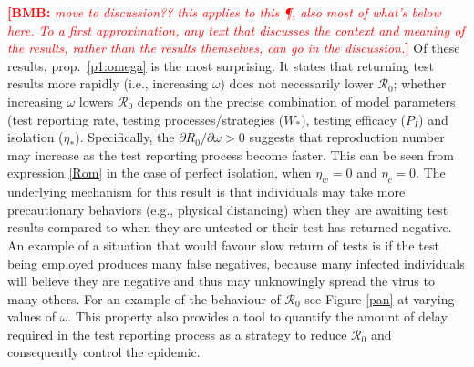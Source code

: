 \documentclass[12pt]{article}
\newcommand{\comment}{\showcomment}
\newcommand{\showcomment}[3]{\textcolor{#1}{\textbf{[#2: }\textsl{#3}\textbf{]}}}
\newcommand{\bmb}[1]{\comment{red}{BMB}{#1}}
\newcommand{\Rnum}{\mathcal{R}_0}
\theoremstyle{definition} %
\begin{document}
 \bmb{move to discussion?? this applies to this \P, also most of what's below here.
   To a first approximation, any text that discusses the context and meaning of the results,
   rather than the results themselves, can go in the discussion.}
Of these results, prop.~\ref{p1:omega} is the most surprising. It states that returning test results more rapidly (i.e., increasing $\omega$) does not necessarily lower $\Rnum$; whether increasing $\omega$ lowers $\Rnum$ depends on the precise combination of model parameters (test reporting rate, testing processes/strategies ($W_*$), testing efficacy ($P_I$) and isolation ($\eta_*$). Specifically, the $\partial{R_0}/\partial{\omega}>0$ suggests that reproduction number may increase as the test reporting process become faster. This can be seen from expression \eqref{Rom} in the case of perfect isolation, when $\eta_w=0$ and $\eta_c=0$. The underlying mechanism for this result is that individuals may take more precautionary behaviors (e.g., physical distancing) when they are awaiting test results compared to when they are untested or their test has returned negative. An example of a situation that would favour slow return of tests is if the test being employed produces many false negatives, because many infected individuals will believe they are negative and thus may unknowingly spread the virus to many others.  For an example of the behaviour of $\Rnum$ see Figure \ref{pan} at varying values of $\omega$. This property also provides a tool to quantify the amount of delay required in the test reporting process as a strategy to reduce $\Rnum$ and consequently control the epidemic.   
\end{document}

